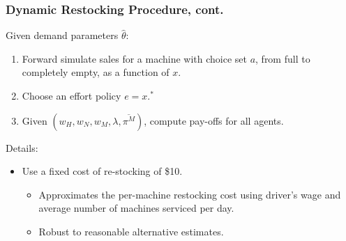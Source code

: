 \documentclass[aspectratio=169]{beamer}
\begin{document}
\begin{frame}
\frametitle{Dynamic Restocking Procedure, cont.}
Given demand parameters $\hat{\theta}$:
\begin{enumerate}
\item Forward simulate sales for a machine with choice set $a$, from full to completely empty, as a function of $x$.
\item Choose an effort policy $e = x.^{*}$
\item Given $(w_H, w_N,w_M,\lambda,\overline{\pi^M})$, compute pay-offs for all agents.
\end{enumerate}
Details:
\begin{itemize}
\item Use a fixed cost of re-stocking of \$10. 
	\begin{itemize}
	\item Approximates the per-machine restocking cost using driver's wage and average number of machines serviced per day.
	\item Robust to reasonable alternative estimates.
	\end{itemize}
\end{itemize}
\end{frame}
\end{document}
